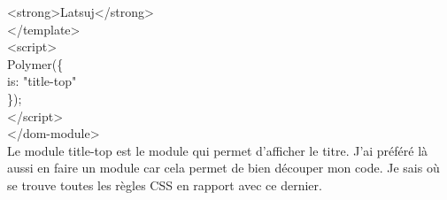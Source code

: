 \documentclass{article}
\begin{document}
{{\hspace*{1.8cm}<strong>Latsuj</strong>\\ 	
\hspace*{1.2cm}</template>\\
\hspace*{1.2cm}<script>\\
\hspace*{1.2cm}Polymer(\{\\
\hspace*{1.8cm}is: "title-top"\\
\hspace*{1.2cm}\});\\
\hspace*{0.6cm}</script>\\
</dom-module>
}}
\vspace{0.5cm}\\
Le module \og title-top \fg{} est le module qui permet d'afficher le titre. J'ai pr\'ef\'er\'e l\`a aussi en faire un module car cela permet de bien d\'ecouper mon code. Je sais o\`u se trouve toutes les r\`egles CSS en rapport avec ce dernier. 
\vspace{0.5cm}\\
\end{document}
